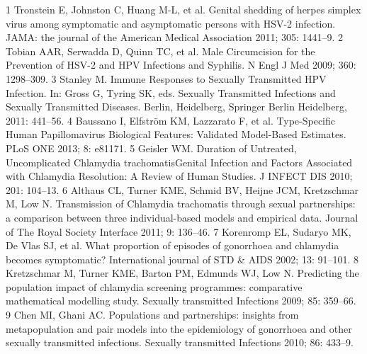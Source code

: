 \documentclass[11pt, onecolumn]{article}
\begin{document}
\newpage

1	Tronstein E, Johnston C, Huang M-L, et al. Genital shedding of herpes simplex virus among symptomatic and asymptomatic persons with HSV-2 infection. JAMA: the journal of the American Medical Association 2011; 305: 1441–9.
2	Tobian AAR, Serwadda D, Quinn TC, et al. Male Circumcision for the Prevention of HSV-2 and HPV Infections and Syphilis. N Engl J Med 2009; 360: 1298–309.
3	Stanley M. Immune Responses to Sexually Transmitted HPV Infection. In: Gross G, Tyring SK, eds. Sexually Transmitted Infections and Sexually Transmitted Diseases. Berlin, Heidelberg, Springer Berlin Heidelberg, 2011: 441–56.
4	Baussano I, Elfström KM, Lazzarato F, et al. Type-Specific Human Papillomavirus Biological Features: Validated Model-Based Estimates. PLoS ONE 2013; 8: e81171.
5	Geisler WM. Duration of Untreated, Uncomplicated Chlamydia trachomatisGenital Infection and Factors Associated with Chlamydia Resolution: A Review of Human Studies. J INFECT DIS 2010; 201: 104–13.
6	Althaus CL, Turner KME, Schmid BV, Heijne JCM, Kretzschmar M, Low N. Transmission of Chlamydia trachomatis through sexual partnerships: a comparison between three individual-based models and empirical data. Journal of The Royal Society Interface 2011; 9: 136–46.
7	Korenromp EL, Sudaryo MK, De Vlas SJ, et al. What proportion of episodes of gonorrhoea and chlamydia becomes symptomatic? International journal of STD & AIDS 2002; 13: 91–101.
8	Kretzschmar M, Turner KME, Barton PM, Edmunds WJ, Low N. Predicting the population impact of chlamydia screening programmes: comparative mathematical modelling study. Sexually transmitted Infections 2009; 85: 359–66.
9	Chen MI, Ghani AC. Populations and partnerships: insights from metapopulation and pair models into the epidemiology of gonorrhoea and other sexually transmitted infections. Sexually transmitted Infections 2010; 86: 433–9.
\end{document}
